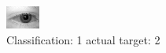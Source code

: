 \begin{figure}[h!]
\begin{center}
\includegraphics[width=0.60\columnwidth]{figures/ID450_class_1_target_2.png}
\end{center}
\caption{ Classification: 1 actual target: 2}
\label{fig:ID450_class_1_target_2}
\end{figure}
